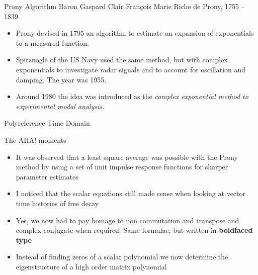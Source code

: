 \documentclass[aspectratio=169,10pt]{beamer} \mode<presentation>
\begin{document}
\begin{frame}[t]{Prony Algorithm}
  Baron Gaspard Clair François Marie Riche de Prony, 1755 -- 1839
  \vspace{8mm}
  \begin{itemize}[<+->]
    \item Prony devised in 1795 an algorithm to estimate an expansion of exponentials to a measured function.
    \item Spitznogle of the US Navy used the same method, but with complex exponentials to investigate radar signals and to account for oscillation and damping. The year was 1955.
    \item Around 1980 the idea was introduced as the \it{complex exponential} method to experimental modal analysis.
  \end{itemize} 
  \vspace{5mm}
\end{frame}

\begin{frame}{Polyreference Time Domain}
  \begin{block}{The AHA! moments}
    \begin{itemize}[<+->]
    \item It was observed that a least square average was possible with the Prony method by using a set of unit impulse response functions for sharper parameter estimates    
    \item I noticed that the scalar equations still made sense when looking at vector time histories of free decay
    \item Yes, we now had to pay homage to non commutation and transpose and complex conjugate when required. Same formulae, but written in \bf{boldfaced type}
    \item Instead of finding zeros of a scalar polynomial we now determine the eigenstructure of a high order matrix polynomial
  \end{itemize}
\end{block}

\end{frame}
\end{document}

